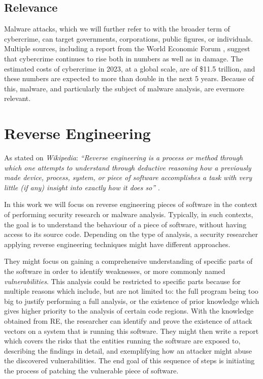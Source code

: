 \subsection{Relevance}

Malware attacks, which we will further refer to with the broader term of cybercrime, can target governments, corporations, public figures, or individuals. Multiple sources, including a report from the World Economic Forum \cite{wef_cybercrime}, suggest that cybercrime continues to rise both in numbers as well as in damage. The estimated costs of cybercrime in 2023, at a global scale, are of \$11.5 trillion, and these numbers are expected to more than double in the next 5 years. Because of this, malware, and particularly the subject of malware analysis, are evermore relevant.

\section{Reverse Engineering} %
\label{sec:reverse_engineering}


As stated on \emph{Wikipedia}: \emph{``Reverse engineering is a process or method through which one attempts to understand through deductive reasoning how a previously made device, process, system, or piece of software accomplishes a task with very little (if any) insight into exactly how it does so''} \cite{re_wiki}.

In this work we will focus on reverse engineering pieces of software in the context of performing security research or malware analysis. Typically, in such contexts, the goal is to understand the behaviour of a piece of software, without having access to its source code. Depending on the type of analysis, a security researcher applying reverse engineering techniques might have different approaches. 

They might focus on gaining a comprehensive understanding of specific parts of the software in order to identify weaknesses, or more commonly named \emph{vulnerabilities}. This analysis could be restricted to specific parts because for multiple reasons which include, but are not limited to: the full program being too big to justify performing a full analysis, or the existence of prior knowledge which gives higher priority to the analysis of certain code regions. With the knowledge obtained from RE, the researcher can identify and prove the existence of attack vectors on a system that is running this software. They might then write a report which covers the risks that the entities running the software are exposed to, describing the findings in detail, and exemplifying how an attacker might abuse the discovered vulnerabilities. The end goal of this sequence of steps is initiating the process of patching the vulnerable piece of software. %

